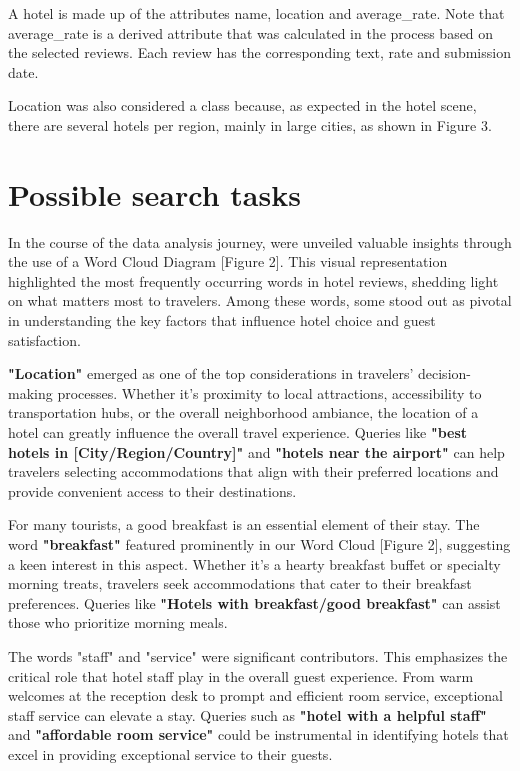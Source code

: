 \documentclass[sigconf]{acmart}
\begin{document}
A hotel is made up of the attributes name, location and average\_rate. Note that average\_rate is a derived attribute that was calculated in the process based on the selected reviews. Each review has the corresponding text, rate and submission date.

Location was also considered a class because, as expected in the hotel scene, there are several hotels per region, mainly in large cities, as shown in Figure 3.

\section{Possible search tasks}

In the course of the data analysis journey, were unveiled valuable insights through the use of a Word Cloud Diagram [Figure 2]. This visual representation highlighted the most frequently occurring words in hotel reviews, shedding light on what matters most to travelers. Among these words, some stood out as pivotal in understanding the key factors that influence hotel choice and guest satisfaction.

\textbf{"Location"} emerged as one of the top considerations in travelers' decision-making processes. Whether it's proximity to local attractions, accessibility to transportation hubs, or the overall neighborhood ambiance, the location of a hotel can greatly influence the overall travel experience. Queries like \textbf{"best hotels in [City/Region/Country]"} and \textbf{"hotels near the airport"} can help travelers selecting accommodations that align with their preferred locations and provide convenient access to their destinations.

For many tourists, a good breakfast is an essential element of their stay. The word \textbf{"breakfast"} featured prominently in our Word Cloud [Figure 2], suggesting a keen interest in this aspect. Whether it's a hearty breakfast buffet or specialty morning treats, travelers seek accommodations that cater to their breakfast preferences. Queries like \textbf{"Hotels with breakfast/good breakfast"} can assist those who prioritize morning meals.

The words "staff" and "service" were significant contributors. This emphasizes the critical role that hotel staff play in the overall guest experience. From warm welcomes at the reception desk to prompt and efficient room service, exceptional staff service can elevate a stay. Queries such as \textbf{"hotel with a helpful staff"} and \textbf{"affordable room service"} could be instrumental in identifying hotels that excel in providing exceptional service to their guests.
\end{document}
